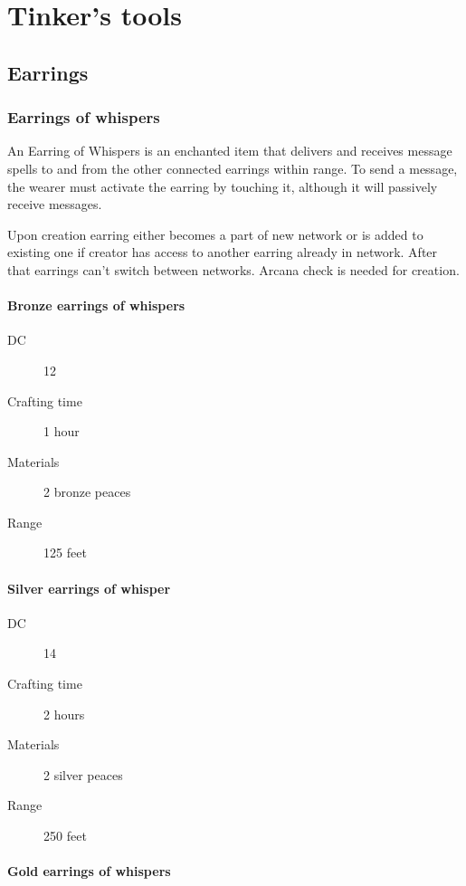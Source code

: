 \chapter{Tinker's tools}

\section{Earrings}

\subsection{Earrings of whispers}

An Earring of Whispers is an enchanted item that delivers and receives message spells to and from the other connected earrings within range. To send a message, the wearer must activate the earring by touching it, although it will passively receive messages.

Upon creation earring either becomes a part of new network or is added to existing one if creator has access to another earring already in network. After that earrings can't switch between networks. Arcana check is needed for creation.

\subsubsection{Bronze earrings of whispers}

\begin{description}
\item [DC] 12
\item [Crafting time] 1 hour
\item [Materials] 2 bronze peaces
\item [Range] 125 feet
\end{description}

\subsubsection{Silver earrings of whisper}

\begin{description}
\item [DC] 14
\item [Crafting time] 2 hours
\item [Materials] 2 silver peaces
\item [Range] 250 feet
\end{description}

\subsubsection{Gold earrings of whispers}

